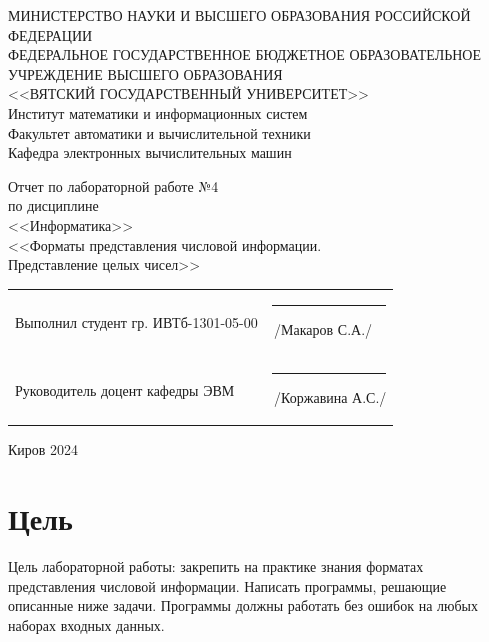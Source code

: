 \documentclass[a4paper,14pt]{extarticle}
\begin{document}
	
	\newpage\thispagestyle{empty}
	\begin{center}
		\MakeUppercase{
			Министерство науки и высшего образования Российской Федерации\\
			Федеральное государственное бюджетное образовательное учреждение высшего образования\\
			<<Вятский Государственный Университет>>\\
		}
		Институт математики и информационных систем\\
		Факультет автоматики и вычислительной техники\\
		Кафедра электронных вычислительных машин
	\end{center}
	\vfill
	
	\begin{center}
		Отчет по лабораторной работе №4\\
		по дисциплине\\
		<<Информатика>>\\
		<<Форматы представления числовой информации.\\Представление целых чисел>>
	\end{center}
	\vfill
	
	\noindent
	\begin{tabular}{ll}
		Выполнил студент гр. ИВТб-1301-05-00 \hspace{5mm} &
		\rule[-1mm]{25mm}{0.10mm}\,/Макаров С.А./\\
		
		Руководитель доцент кафедры ЭВМ & \rule[-1mm]{25mm}{0.10mm}\,/Коржавина А.С./\\
	\end{tabular}
	
	\vfill
	\begin{center}
		Киров 2024
	\end{center}
	
	\newpage
	\section*{Цель}
	Цель лабораторной работы: закрепить на практике знания форматах представления числовой информации. Написать программы, решающие описанные ниже задачи. Программы должны работать без ошибок на любых наборах входных данных.
	
\end{document}
